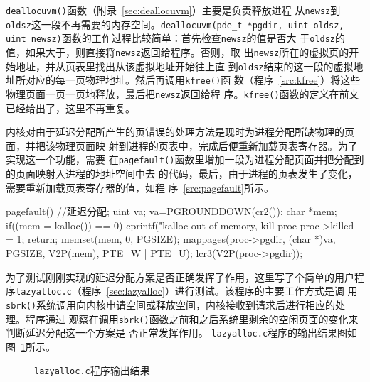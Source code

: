 \documentclass{swfuthesism}
\begin{document}
\texttt{deallocuvm()}函数（附录~\ref{sec:deallocuvm}）主要是负责释放进程
从\texttt{newsz}到\texttt{oldsz}这一段不再需要的内存空间。\texttt{deallocuvm(pde\_t
  *pgdir, uint oldsz, uint newsz)}函数的工作过程比较简单：首先检查\texttt{newsz}的值是否大
于\texttt{oldsz}的值，如果大于，则直接将\texttt{newsz}返回给程序。否则，取
出\texttt{newsz}所在的虚拟页的开始地址，并从页表里找出从该虚拟地址开始往上直
到\texttt{oldsz}结束的这一段的虚拟地址所对应的每一页物理地址。然后再调用\texttt{kfree()}函
数（程序~\ref{src:kfree}）将这些物理页面一页一页地释放，最后把\texttt{newsz}返回给程
序。\texttt{kfree()}函数的定义在前文已经给出了，这里不再重复。

内核对由于延迟分配所产生的页错误的处理方法是现时为进程分配所缺物理的页面，并把该物理页面映
射到进程的页表中，完成后便重新加载页表寄存器。为了实现这一个功能，需要
在\texttt{pagefault()}函数里增加一段为进程分配页面并把分配到的页面映射入进程的地址空间中去
的代码，最后，由于进程的页表发生了变化，需要重新加载页表寄存器的值，如程
序~\ref{src:pagefault}所示。 

\begin{listing}
  \begin{codeblock}
\begin{ccode}
pagefault()
 {//延迟分配;
   uint va;
   va=PGROUNDDOWN(cr2());
   char *mem;
   if((mem = kalloc()) == 0) {
     cprintf("kalloc out of memory, kill proc %
     proc->killed = 1;
     return;
   }
   memset(mem, 0, PGSIZE);
   mappages(proc->pgdir, (char *)va, PGSIZE, V2P(mem), PTE_W | PTE_U);
   lcr3(V2P(proc->pgdir));
  }
\end{ccode}
  \end{codeblock}
  \label{src:pagefault}
\end{listing}
 
为了测试刚刚实现的延迟分配方案是否正确发挥了作用，这里写了个简单的用户程
序\texttt{lazyalloc.c}（程序~\ref{sec:lazyalloc}）进行测试。该程序的主要工作方式是调
用\texttt{sbrk()}系统调用向内核申请空间或释放空间，内核接收到请求后进行相应的处理。程序通过
观察在调用\texttt{sbrk()}函数之前和之后系统里剩余的空闲页面的变化来判断延迟分配这一个方案是
否正常发挥作用。 \texttt{lazyalloc.c}程序的输出结果图如图~\ref{fig:lazyalloc}所示。
 
\begin{figure}
  \centering {}
  \caption{\texttt{lazyalloc.c}程序输出结果}\label{fig:lazyalloc}
\end{figure}
\end{document}
